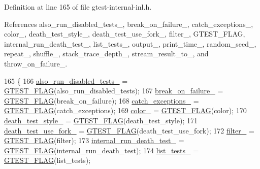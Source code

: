 Definition at line 165 of file gtest-\/internal-\/inl.\+h.



References also\+\_\+run\+\_\+disabled\+\_\+tests\+\_\+, break\+\_\+on\+\_\+failure\+\_\+, catch\+\_\+exceptions\+\_\+, color\+\_\+, death\+\_\+test\+\_\+style\+\_\+, death\+\_\+test\+\_\+use\+\_\+fork\+\_\+, filter\+\_\+, G\+T\+E\+S\+T\+\_\+\+F\+L\+AG, internal\+\_\+run\+\_\+death\+\_\+test\+\_\+, list\+\_\+tests\+\_\+, output\+\_\+, print\+\_\+time\+\_\+, random\+\_\+seed\+\_\+, repeat\+\_\+, shuffle\+\_\+, stack\+\_\+trace\+\_\+depth\+\_\+, stream\+\_\+result\+\_\+to\+\_\+, and throw\+\_\+on\+\_\+failure\+\_\+.


\begin{DoxyCode}
165                    \{
166     \hyperlink{classtesting_1_1internal_1_1GTestFlagSaver_ad940f8cb0287f0498abfbb8cd3f63676}{also\_run\_disabled\_tests\_} = \hyperlink{gtest-port_8h_a828f4e34a1c4b510da50ec1563e3562a}{GTEST\_FLAG}(also\_run\_disabled\_tests);
167     \hyperlink{classtesting_1_1internal_1_1GTestFlagSaver_a63eb38f3e9f048128314129a6eadfbaf}{break\_on\_failure\_} = \hyperlink{gtest-port_8h_a828f4e34a1c4b510da50ec1563e3562a}{GTEST\_FLAG}(break\_on\_failure);
168     \hyperlink{classtesting_1_1internal_1_1GTestFlagSaver_a7ea119ac4f2b4410bb97a85aaa753ff2}{catch\_exceptions\_} = \hyperlink{gtest-port_8h_a828f4e34a1c4b510da50ec1563e3562a}{GTEST\_FLAG}(catch\_exceptions);
169     \hyperlink{classtesting_1_1internal_1_1GTestFlagSaver_a0ea1a453d5a44ba56a80b7e9c3ce9097}{color\_} = \hyperlink{gtest-port_8h_a828f4e34a1c4b510da50ec1563e3562a}{GTEST\_FLAG}(color);
170     \hyperlink{classtesting_1_1internal_1_1GTestFlagSaver_aaafc84990f1c135a56f8a1e5009adf7e}{death\_test\_style\_} = \hyperlink{gtest-port_8h_a828f4e34a1c4b510da50ec1563e3562a}{GTEST\_FLAG}(death\_test\_style);
171     \hyperlink{classtesting_1_1internal_1_1GTestFlagSaver_a9b243970df7a8d33764537f358ebe384}{death\_test\_use\_fork\_} = \hyperlink{gtest-port_8h_a828f4e34a1c4b510da50ec1563e3562a}{GTEST\_FLAG}(death\_test\_use\_fork);
172     \hyperlink{classtesting_1_1internal_1_1GTestFlagSaver_ac4de0e4e127f7b08112dfbd564f24000}{filter\_} = \hyperlink{gtest-port_8h_a828f4e34a1c4b510da50ec1563e3562a}{GTEST\_FLAG}(filter);
173     \hyperlink{classtesting_1_1internal_1_1GTestFlagSaver_ac609bb5e1a2433d5d1bec59305b363b1}{internal\_run\_death\_test\_} = \hyperlink{gtest-port_8h_a828f4e34a1c4b510da50ec1563e3562a}{GTEST\_FLAG}(internal\_run\_death\_test);
174     \hyperlink{classtesting_1_1internal_1_1GTestFlagSaver_ac9cdb0db488527001acc3f34f066cce3}{list\_tests\_} = \hyperlink{gtest-port_8h_a828f4e34a1c4b510da50ec1563e3562a}{GTEST\_FLAG}(list\_tests);

\end{DoxyCode}

